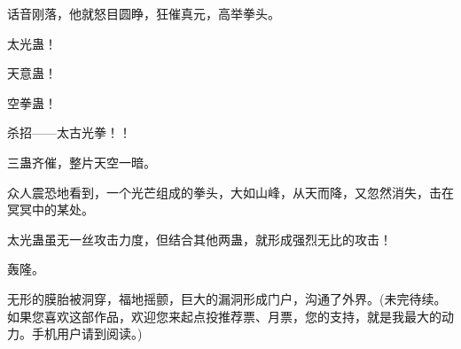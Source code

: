 \begin{this_body}
话音刚落，他就怒目圆睁，狂催真元，高举拳头。

太光蛊！

天意蛊！

空拳蛊！

杀招——太古光拳！！

三蛊齐催，整片天空一暗。

众人震恐地看到，一个光芒组成的拳头，大如山峰，从天而降，又忽然消失，击在冥冥中的某处。

太光蛊虽无一丝攻击力度，但结合其他两蛊，就形成强烈无比的攻击！

轰隆。

无形的膜胎被洞穿，福地摇颤，巨大的漏洞形成门户，沟通了外界。(未完待续。如果您喜欢这部作品，欢迎您来起点投推荐票、月票，您的支持，就是我最大的动力。手机用户请到阅读。)

\end{this_body}

